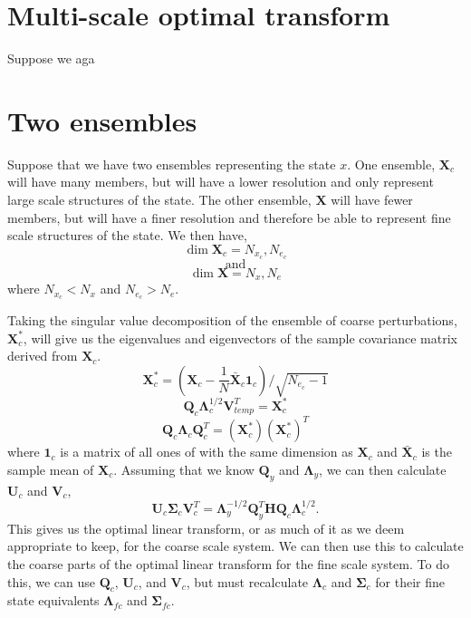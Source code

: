\documentclass[11pt]{article} %
\newcommand{\mat}{\mathbf}
\begin{document}
\section{Multi-scale optimal transform}

Suppose we aga


\section{Two ensembles}

Suppose that we have two ensembles representing the state $x$.
One ensemble, $\mat{X}_c$ will have many members, but will have a lower
resolution and only represent large scale structures of the state.
The other ensemble, $\mat{X}$ will have fewer members, but will
have a finer resolution and therefore be able to represent fine scale
structures of the state.
We then have,
\[
  \dim \mat{X}_c = N_{x_c}, N_{e_c}
\]
\[\text{and}\]
\[
  \dim \mat{X} = N_x, N_e
\]
where $N_{x_c} < N_x$ and $N_{e_c} > N_e$.

Taking the singular value decomposition of the ensemble of
coarse perturbations, $\mat{X}_c^*$, will give us the eigenvalues and
eigenvectors of the sample covariance matrix derived from $\mat{X}_c$.
\[
  \mat{X}_c^{*} = \left( \mat{X}_c - \frac{1}{N}\bar{\mat{X}}_c
  \mat{1}_c \right) / \sqrt{N_{e_c} - 1}
\]
\[
  \mat{Q}_c \mat{\Lambda}_c^{1/2} \mat{V}^T_{temp} = \mat{X}_c^*
\]
\[
  \mat{Q}_c \mat{\Lambda}_c \mat{Q}_c^T = (\mat{X}_c^*)
  {(\mat{X}_c^*)}^{T}
\]
where $\mat{1}_c$ is a matrix of all ones of with the same dimension as
$\mat{X}_c$ and $\bar{\mat{X}}_c$ is the sample mean of $\mat{X}_c$.
Assuming that we know $\mat{Q}_y$ and $\mat{\Lambda}_y$, we can then
calculate $\mat{U}_c$ and $\mat{V}_c$,
\[
  \mat{U}_c \mat{\Sigma}_c \mat{V}_c^T = \mat{\Lambda}^{-1/2}_y
  \mat{Q}_y^T \mat{H} \mat{Q}_c \mat{\Lambda}^{1/2}_c.
\]
This gives us the optimal linear transform, or as much of it as we
deem appropriate to keep, for the coarse scale system.
We can then use this to calculate the coarse parts of the optimal
linear transform for the fine scale system.
To do this, we can use $\mat{Q}_c$, $\mat{U}_c$, and $\mat{V}_c$, but
must recalculate $\mat{\Lambda}_c$ and $\mat{\Sigma}_c$ for their fine
state equivalents $\mat{\Lambda}_{fc}$ and $\mat{\Sigma}_{fc}$.
\end{document}
